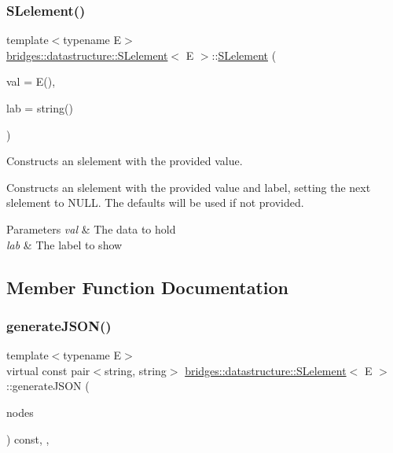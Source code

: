 \subsubsection{\texorpdfstring{S\+Lelement()}{SLelement()}\hspace{0.1cm}{\footnotesize\ttfamily [2/2]}}
{\footnotesize\ttfamily template$<$typename E$>$ \\
\hyperlink{classbridges_1_1datastructure_1_1_s_lelement}{bridges\+::datastructure\+::\+S\+Lelement}$<$ E $>$\+::\hyperlink{classbridges_1_1datastructure_1_1_s_lelement}{S\+Lelement} (\begin{DoxyParamCaption}\item[{const E \&}]{val = {\ttfamily E()},  }\item[{const string \&}]{lab = {\ttfamily string()} }\end{DoxyParamCaption})\hspace{0.3cm}{\ttfamily [inline]}}



Constructs an slelement with the provided value. 

Constructs an slelement with the provided value and label, setting the next slelement to N\+U\+LL. The defaults will be used if not provided.


\begin{DoxyParams}{Parameters}
{\em val} & The data to hold \\
\hline
{\em lab} & The label to show \\
\hline
\end{DoxyParams}


\subsection{Member Function Documentation}
\mbox{\label{classbridges_1_1datastructure_1_1_s_lelement_a15d224314bbda510603042b504322410}} 
\subsubsection{\texorpdfstring{generate\+J\+S\+O\+N()}{generateJSON()}}
{\footnotesize\ttfamily template$<$typename E$>$ \\
virtual const pair$<$string, string$>$ \hyperlink{classbridges_1_1datastructure_1_1_s_lelement}{bridges\+::datastructure\+::\+S\+Lelement}$<$ E $>$\+::generate\+J\+S\+ON (\begin{DoxyParamCaption}\item[{vector$<$ const \hyperlink{classbridges_1_1datastructure_1_1_s_lelement}{S\+Lelement}$<$ E $>$ $\ast$$>$}]{nodes }\end{DoxyParamCaption}) const\hspace{0.3cm}{\ttfamily [inline]}, {\ttfamily [protected]}, {\ttfamily [virtual]}}



